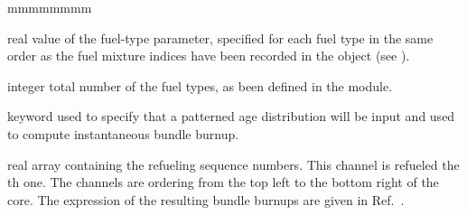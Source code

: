 \begin{ListeDeDescription}{mmmmmmmm}
\item[\dusa{fvalue}] real value of the fuel-type parameter, specified for each
fuel type in the same order as the fuel mixture indices have been recorded in
the  object (see ).

\item[\dusa{nfuel}] integer total number of the fuel types, as been
defined in the  module.

\item[\moc{CELL}] keyword used to specify that a patterned age distribution will be
input and used to compute instantaneous bundle burnup.

\item[\dusa{ialch}] real array containing the refueling sequence numbers. This channel
is refueled the th one. The channels are ordering from the top left to the bottom right of the core. The expression of the resulting bundle 
burnups are given in Ref.~.

\end{ListeDeDescription}
\clearpage
